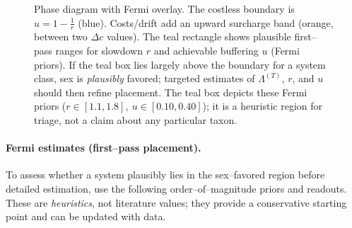 \documentclass[11pt]{article}
\theoremstyle{upright}
\begin{document}
\begin{figure}[t]

\caption{Phase diagram with Fermi overlay. The costless boundary is $u=1-\tfrac{1}{r}$ (blue). Costs/drift add an upward surcharge band (orange, between two $\Delta c$ values). The teal rectangle shows plausible first–pass ranges for slowdown $r$ and achievable buffering $u$ (Fermi priors). If the teal box lies largely above the boundary for a system class, sex is \emph{plausibly} favored; targeted estimates of $\Lambda^{(T)}$, $r$, and $u$ should then refine placement. The teal box depicts these Fermi priors (\(r\in[1.1,1.8],\ u\in[0.10,0.40]\)); it is a heuristic region for triage, not a claim about any particular taxon.} 
\label{fig:phase-fermi}
\end{figure}

\paragraph{Fermi estimates (first–pass placement).}
To assess whether a system plausibly lies in the sex–favored region before detailed estimation,
use the following order–of–magnitude priors and readouts. These are \emph{heuristics}, not literature values;
they provide a conservative starting point and can be updated with data.
\end{document}
